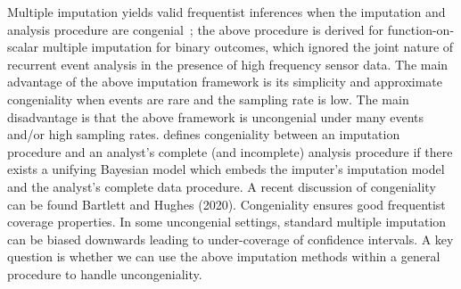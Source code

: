 \documentclass[12pt]{amsart}
\begin{document}
Multiple imputation yields valid frequentist inferences when the imputation and analysis procedure are congenial~\citep{Meng1994};  the above procedure is derived for function-on-scalar multiple imputation for binary outcomes, which ignored the joint nature of recurrent event analysis in the presence of high frequency sensor data. The main advantage of the above imputation framework is its simplicity and approximate congeniality when events are rare and the sampling rate is low.  The main disadvantage is that the above framework is uncongenial under many events and/or high sampling rates. \cite{Meng1994} defines congeniality between an imputation procedure and an analyst’s complete (and incomplete) analysis procedure if there exists a unifying Bayesian model which embeds the imputer’s imputation model and the analyst’s complete data procedure.  A recent discussion of congeniality can be found Bartlett and Hughes (2020). Congeniality ensures good frequentist coverage properties. In some uncongenial settings, standard multiple imputation can be biased downwards leading to under-coverage of confidence intervals.    A key question is whether we can use the above imputation methods within a general procedure to handle uncongeniality.
\end{document}
